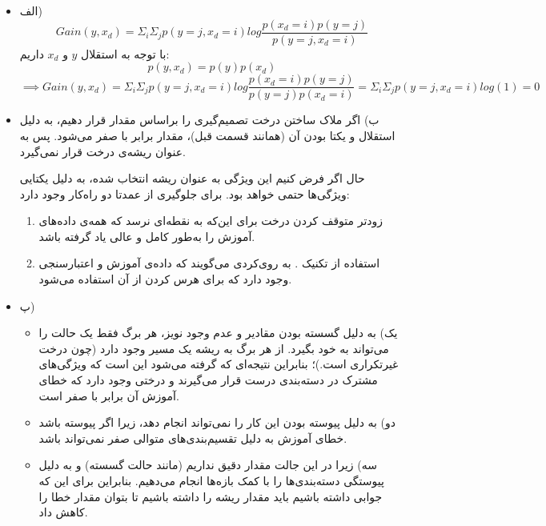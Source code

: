 
\begin{itemize}
	\item الف)
	$$
	Gain(y, x_d) = \Sigma_{i}\Sigma_{j} p(y=j, x_d=i) log \frac{p(x_d=i)p(y=j)}{p(y=j, x_d=i)}
	$$
	با توجه به استقلال $y$ و $x_d$ داریم:
	$$
	p(y, x_d) = p(y)p(x_d)
	$$
	$$
	\implies Gain(y, x_d) = \Sigma_{i}\Sigma_{j} p(y=j, x_d=i) log \frac{p(x_d=i)p(y=j)}{p(y=j)p(x_d=i)}
	= \Sigma_{i}\Sigma_{j} p(y=j, x_d=i) log(1) = 0$$ 
	\item ب)
	اگر ملاک ساختن درخت تصمیم‌گیری را براساس مقدار  قرار دهیم، به دلیل استقلال و یکتا بودن آن (همانند قسمت قبل)، مقدار  برابر با صفر می‌شود. پس به عنوان ریشه‌ی درخت قرار نمی‌گیرد. 
	
	حال اگر فرض کنیم این ویژگی به عنوان ریشه انتخاب شده،  به دلیل یکتایی ویژگی‌ها حتمی خواهد بود. برای جلوگیری از  عمدتا دو راه‌کار وجود دارد:
	\begin{enumerate}
		\item زودتر متوقف کردن درخت برای  این‌که به نقطه‌ای نرسد که همه‌ی داده‌های آموزش را به‌طور کامل و عالی یاد گرفته باشد.
		\item استفاده از تکنیک . به روی‌کردی می‌گویند که داده‌ی آموزش و اعتبارسنجی وجود دارد که برای هرس کردن از آن استفاده می‌شود.
	\end{enumerate}
	\item پ)
	\begin{itemize}
		\item یک)
		به دلیل گسسته بودن مقادیر و عدم وجود نویز، هر برگ فقط یک حالت را می‌تواند به خود بگیرد. از هر برگ به ریشه یک مسیر وجود دارد‌ (چون درخت غیرتکراری است.)؛ بنابراین نتیجه‌ای که گرفته می‌شود این است که ویژگی‌های مشترک در دسته‌بندی درست قرار می‌گیرند و درختی وجود دارد که خطای آموزش آن برابر با صفر است.
		\item دو)
		به دلیل پیوسته بودن این کار را نمی‌تواند انجام دهد،‌ زیرا اگر پیوسته باشد خطای آموزش به دلیل تقسیم‌بندی‌های متوالی صفر نمی‌تواند باشد.
		\item سه) زیرا در این جالت مقدار دقیق نداریم (مانند حالت گسسته) و به دلیل پیوستگی دسته‌بندی‌ها را با کمک بازه‌ها انجام می‌دهیم. بنابراین برای این که جوابی داشته باشیم باید مقدار ریشه را داشته باشیم تا بتوان مقدار خطا را کاهش داد.
	\end{itemize}
\end{itemize}